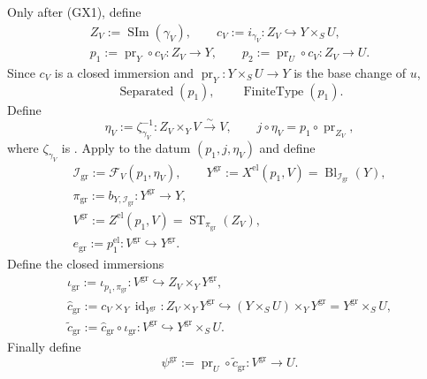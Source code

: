 \begin{definition}
\[  \]
  Only after (GX1), define
  \[
  \begin{gathered}
    Z_V:=\operatorname{SIm}(\gamma_V),\qquad
    c_V:=i_{\gamma_V}\colon Z_V\hookrightarrow Y\times_SU,\\
    p_1:=\operatorname{pr}_Y\circ c_V\colon Z_V\to Y,\qquad
    p_2:=\operatorname{pr}_U\circ c_V\colon Z_V\to U.
  \end{gathered}
  \]
  Since $c_V$ is a closed immersion and
  $\operatorname{pr}_Y\colon Y\times_SU\to Y$ is the base change of $u$,
  \[
    \operatorname{Separated}(p_1),\qquad
    \operatorname{FiniteType}(p_1).
  \]
  Define
  \[
    \eta_V:=\zeta_{\gamma_V}^{-1}
      \colon Z_V\times_YV\xrightarrow{\sim}V,
    \qquad
    j\circ\eta_V=p_1\circ\operatorname{pr}_{Z_V},
  \]
  where $\zeta_{\gamma_V}$ is
  .  Apply
   to the datum
  $(p_1,j,\eta_V)$ and define
  \[
  \begin{gathered}
    \mathcal I_{\mathrm{gr}}:=\mathcal F_V(p_1,\eta_V),\qquad
    Y^{\mathrm{gr}}:=X^{\mathrm{el}}(p_1,V)
      =\operatorname{Bl}_{\mathcal I_{\mathrm{gr}}}(Y),\\
    \pi_{\mathrm{gr}}:=b_{Y,\mathcal I_{\mathrm{gr}}}
      \colon Y^{\mathrm{gr}}\to Y,\\
    V^{\mathrm{gr}}:=Z^{\mathrm{el}}(p_1,V)
      =\operatorname{ST}_{\pi_{\mathrm{gr}}}(Z_V),\\
    e_{\mathrm{gr}}:=p_1^{\mathrm{el}}\colon
      V^{\mathrm{gr}}\hookrightarrow Y^{\mathrm{gr}}.
  \end{gathered}
  \]
  Define the closed immersions
  \[
  \begin{gathered}
    \iota_{\mathrm{gr}}:=\iota_{p_1,\pi_{\mathrm{gr}}}
      \colon V^{\mathrm{gr}}\hookrightarrow Z_V\times_YY^{\mathrm{gr}},\\
    \widehat c_{\mathrm{gr}}:=
      c_V\times_Y\operatorname{id}_{Y^{\mathrm{gr}}}
      \colon Z_V\times_YY^{\mathrm{gr}}\hookrightarrow
        (Y\times_SU)\times_YY^{\mathrm{gr}}
        =Y^{\mathrm{gr}}\times_SU,\\
    \widetilde c_{\mathrm{gr}}:=
      \widehat c_{\mathrm{gr}}\circ\iota_{\mathrm{gr}}
      \colon V^{\mathrm{gr}}\hookrightarrow Y^{\mathrm{gr}}\times_SU.
  \end{gathered}
  \]
  Finally define
  \[
    \psi^{\mathrm{gr}}
      :=\operatorname{pr}_U\circ\widetilde c_{\mathrm{gr}}
      \colon V^{\mathrm{gr}}\to U.
  \]
\end{definition}


